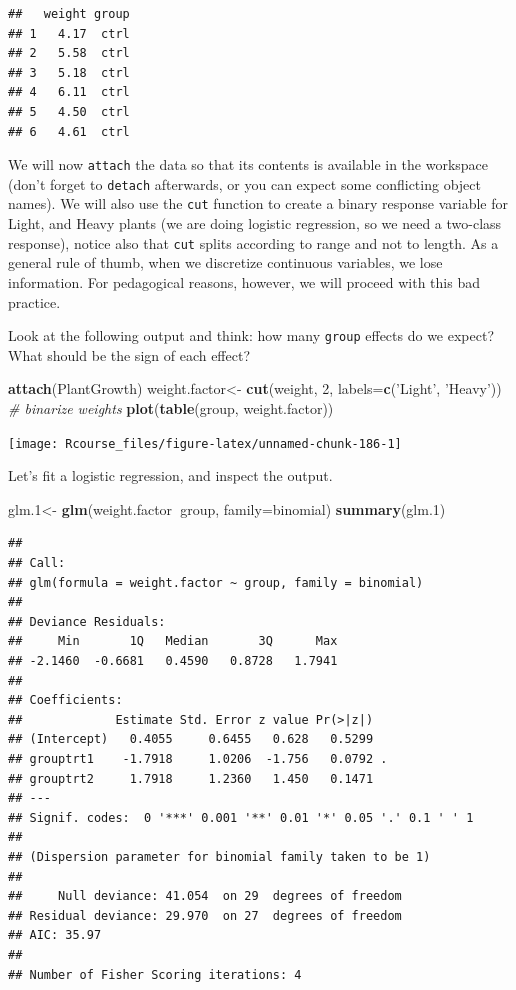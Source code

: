 \documentclass[]{book}
\newenvironment{Shaded}{\begin{snugshade}}{\end{snugshade}}
\newcommand{\CommentTok}[1]{\textcolor[rgb]{0.56,0.35,0.01}{\textit{#1}}}
\newcommand{\DataTypeTok}[1]{\textcolor[rgb]{0.13,0.29,0.53}{#1}}
\newcommand{\DecValTok}[1]{\textcolor[rgb]{0.00,0.00,0.81}{#1}}
\newcommand{\FloatTok}[1]{\textcolor[rgb]{0.00,0.00,0.81}{#1}}
\newcommand{\KeywordTok}[1]{\textcolor[rgb]{0.13,0.29,0.53}{\textbf{#1}}}
\newcommand{\NormalTok}[1]{#1}
\newcommand{\OperatorTok}[1]{\textcolor[rgb]{0.81,0.36,0.00}{\textbf{#1}}}
\newcommand{\StringTok}[1]{\textcolor[rgb]{0.31,0.60,0.02}{#1}}
\theoremstyle{definition}
\theoremstyle{definition}
\theoremstyle{definition}
\theoremstyle{remark}
\begin{document}
\begin{verbatim}
##   weight group
## 1   4.17  ctrl
## 2   5.58  ctrl
## 3   5.18  ctrl
## 4   6.11  ctrl
## 5   4.50  ctrl
## 6   4.61  ctrl
\end{verbatim}

We will now \texttt{attach} the data so that its contents is available in the workspace (don't forget to \texttt{detach} afterwards, or you can expect some conflicting object names).
We will also use the \texttt{cut} function to create a binary response variable for Light, and Heavy plants (we are doing logistic regression, so we need a two-class response), notice also that \texttt{cut} splits according to range and not to length.
As a general rule of thumb, when we discretize continuous variables, we lose information.
For pedagogical reasons, however, we will proceed with this bad practice.

Look at the following output and think: how many \texttt{group} effects do we expect? What should be the sign of each effect?

\begin{Shaded}
\begin{Highlighting}[]
\KeywordTok{attach}\NormalTok{(PlantGrowth)}
\NormalTok{weight.factor<-}\StringTok{ }\KeywordTok{cut}\NormalTok{(weight, }\DecValTok{2}\NormalTok{, }\DataTypeTok{labels=}\KeywordTok{c}\NormalTok{(}\StringTok{'Light'}\NormalTok{, }\StringTok{'Heavy'}\NormalTok{)) }\CommentTok{# binarize weights}
\KeywordTok{plot}\NormalTok{(}\KeywordTok{table}\NormalTok{(group, weight.factor))}
\end{Highlighting}
\end{Shaded}

\texttt{[image: Rcourse\_files/figure-latex/unnamed-chunk-186-1]}

Let's fit a logistic regression, and inspect the output.

\begin{Shaded}
\begin{Highlighting}[]
\NormalTok{glm}\FloatTok{.1}\NormalTok{<-}\StringTok{ }\KeywordTok{glm}\NormalTok{(weight.factor}\OperatorTok{~}\NormalTok{group, }\DataTypeTok{family=}\NormalTok{binomial)}
\KeywordTok{summary}\NormalTok{(glm}\FloatTok{.1}\NormalTok{)}
\end{Highlighting}
\end{Shaded}

\begin{verbatim}
## 
## Call:
## glm(formula = weight.factor ~ group, family = binomial)
## 
## Deviance Residuals: 
##     Min       1Q   Median       3Q      Max  
## -2.1460  -0.6681   0.4590   0.8728   1.7941  
## 
## Coefficients:
##             Estimate Std. Error z value Pr(>|z|)  
## (Intercept)   0.4055     0.6455   0.628   0.5299  
## grouptrt1    -1.7918     1.0206  -1.756   0.0792 .
## grouptrt2     1.7918     1.2360   1.450   0.1471  
## ---
## Signif. codes:  0 '***' 0.001 '**' 0.01 '*' 0.05 '.' 0.1 ' ' 1
## 
## (Dispersion parameter for binomial family taken to be 1)
## 
##     Null deviance: 41.054  on 29  degrees of freedom
## Residual deviance: 29.970  on 27  degrees of freedom
## AIC: 35.97
## 
## Number of Fisher Scoring iterations: 4
\end{verbatim}
\end{document}
